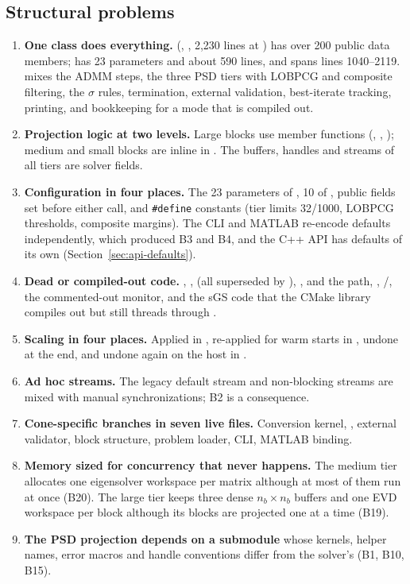 \documentclass[11pt]{article}
\begin{document}
\subsection{Structural problems}
\begin{enumerate}[label=\textbf{P\arabic*.}]
  \item \textbf{One class does everything.}  (,
  , 2{,}230 lines at ) has over 200 public data members;  has 23
  parameters and about 590 lines, and  spans lines 1040--2119.  mixes the ADMM
  steps, the three PSD tiers with LOBPCG and composite filtering, the $\sigma$ rules, termination, external
  validation, best-iterate tracking, printing, and bookkeeping for a mode that is compiled out.
  \item \textbf{Projection logic at two levels.} Large blocks use member functions
  (, , ); medium and
  small blocks are inline in . The buffers, handles and streams of all tiers are solver fields.
  \item \textbf{Configuration in four places.} The 23 parameters of , 10 of ,
  public fields set before either call, and \texttt{\#define} constants (tier limits 32/1000, LOBPCG
  thresholds, composite margins). The CLI and MATLAB re-encode defaults independently, which produced B3
  and B4, and the C++ API has defaults of its own (Section~\ref{sec:api-defaults}).
  \item \textbf{Dead or compiled-out code.} , , 
  (all superseded by ), , 
  and the  path, , /, the commented-out monitor,
  and the sGS code that the CMake library compiles out but still threads through .
  \item \textbf{Scaling in four places.} Applied in , re-applied for warm starts in
  , undone at the end, and undone again on the host in .
  \item \textbf{Ad hoc streams.} The legacy default stream and non-blocking streams are mixed with manual
  synchronizations; B2 is a consequence.
  \item \textbf{Cone-specific branches in seven live files.} Conversion kernel, ,
  external validator, block structure, problem loader, CLI, MATLAB binding.
  \item \textbf{Memory sized for concurrency that never happens.} The medium tier allocates one
  eigensolver workspace per matrix although at most  of them run at once (B20). The large
  tier keeps three dense $n_b\times n_b$ buffers and one EVD workspace per block although its blocks are
  projected one at a time (B19).
  \item \textbf{The PSD projection depends on a submodule} whose kernels, helper names, error macros and
  handle conventions differ from the solver's (B1, B10, B15).
\end{enumerate}
\end{document}
